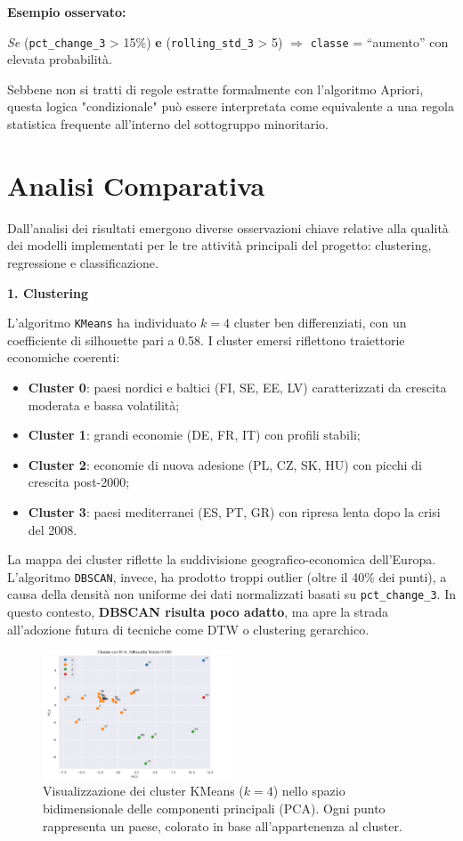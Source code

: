 \documentclass[conference]{IEEEtran}
\begin{document}
\noindent\textbf{Esempio osservato:}

{\centering \textit{Se} (\texttt{pct\_change\_3} > 15\%) \textbf{e} (\texttt{rolling\_std\_3} > 5) $\Rightarrow$ \texttt{classe} = “aumento” con elevata probabilità.}

Sebbene non si tratti di regole estratte formalmente con l’algoritmo Apriori, questa logica "condizionale" può essere interpretata come equivalente a una regola statistica frequente all’interno del sottogruppo minoritario.

\section*{\Large \textbf{Analisi Comparativa}}

Dall’analisi dei risultati emergono diverse osservazioni chiave relative alla qualità dei modelli implementati per le tre attività principali del progetto: clustering, regressione e classificazione.

\vspace{1em}\noindent\textbf{1. Clustering}

L’algoritmo \texttt{KMeans} ha individuato $k = 4$ cluster ben differenziati, con un coefficiente di silhouette pari a 0.58. I cluster emersi riflettono traiettorie economiche coerenti:

\begin{itemize}
  \item \textbf{Cluster 0}: paesi nordici e baltici (FI, SE, EE, LV) caratterizzati da crescita moderata e bassa volatilità;
  \item \textbf{Cluster 1}: grandi economie (DE, FR, IT) con profili stabili;
  \item \textbf{Cluster 2}: economie di nuova adesione (PL, CZ, SK, HU) con picchi di crescita post-2000;
  \item \textbf{Cluster 3}: paesi mediterranei (ES, PT, GR) con ripresa lenta dopo la crisi del 2008.
\end{itemize}
La mappa dei cluster riflette la suddivisione geografico-economica dell’Europa. L’algoritmo \texttt{DBSCAN}, invece, ha prodotto troppi outlier (oltre il 40\% dei punti), a causa della densità non uniforme dei dati normalizzati basati su \texttt{pct\_change\_3}. In questo contesto, \textbf{DBSCAN risulta poco adatto}, ma apre la strada all’adozione futura di tecniche come DTW o clustering gerarchico.
\begin{figure}[H]
\centering
\includegraphics[width=0.5\textwidth]{Kmeans.png}
\caption{Visualizzazione dei cluster KMeans ($k=4$) nello spazio bidimensionale delle componenti principali (PCA). Ogni punto rappresenta un paese, colorato in base all’appartenenza al cluster.}
\label{fig:kmeans-cluster-map}
\end{figure}
\end{document}
